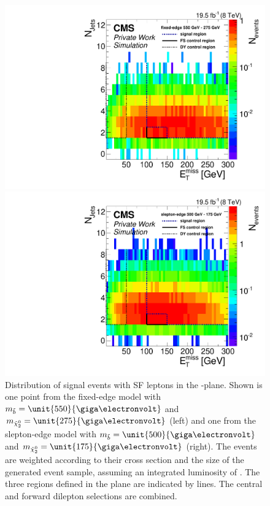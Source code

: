 \begin{figure}[htbp]
\centering
\begin{minipage}[t]{0.49\textwidth}
  \includegraphics[width=\textwidth]{plots/SELECTION/metJetsScatter_SUSY_edge_550_275.pdf}
\end{minipage}
\begin{minipage}[t]{0.49\textwidth}
\includegraphics[width=\textwidth]{plots/SELECTION/metJetsScatter_SUSY_slepton_500_175.pdf}
\end{minipage}
\caption{Distribution of signal events with SF leptons in the \MET-\njets plane. Shown is one point from the fixed-edge model with $m_{\sbottom} = \unit{550}{\giga\electronvolt}$ and $m_{\secondchi} = \unit{275}{\giga\electronvolt}$ (left) and one from the slepton-edge model with $m_{\sbottom} = \unit{500}{\giga\electronvolt}$ and $m_{\secondchi} = \unit{175}{\giga\electronvolt}$ (right). The events are weighted according to their cross section and the size of the generated event sample, assuming an integrated luminosity of \lumi. The three regions defined in the plane are indicated by lines. The central and forward dilepton selections are combined.}
\label{fig:sigRegionSignal}
\end{figure}    

